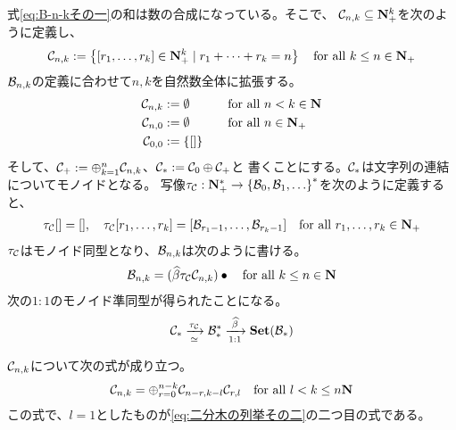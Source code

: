 {	式\eqref{eq:B-n-kその一}の和は数の合成になっている。そこで、
	${\mathcal{C}}_{n,k}\subseteq\mathbf{N}_+^k$を次のように定義し、
	\begin{equation*}\begin{split}
		{\mathcal{C}}_{n,k} := \mathinner{\left\{{{\mathinner{\left[{r_1,\dots,r_k}\right]}}\in\ensuremath{\mathbf{N}}_+^k\mid
			r_1+\cdots+r_k=n}\right\}} \quad\text{for all } k\le n\in\mathbf{N}_+
	\end{split}\end{equation*}
	${\mathcal{B}}_{n,k}$の定義に合わせて$n,k$を自然数全体に拡張する。
	\begin{alignat*}{2}
		{\mathcal{C}}_{n,k} &:= \emptyset &&\quad\text{for all } n<k\in\mathbf{N} \\
		{\mathcal{C}}_{n,0} &:= \emptyset &&\quad\text{for all } n\in\mathbf{N}_+ \\
		{\mathcal{C}}_{0,0} &:= \mathinner{\left\{{{\mathinner{\left[{}\right]}}}\right\}}
	\end{alignat*}
	そして、${\mathcal{C}}_+:=\oplus_{k=1}^n{\mathcal{C}}_{n,k}$、${\mathcal{C}}_*:={\mathcal{C}}_0\oplus{\mathcal{C}}_+$と
	書くことにする。${\mathcal{C}}_*$は文字列の連結についてモノイドとなる。
	写像$\tau_{\mathcal{C}}:\mathbf{N}_+^*\to\mathinner{\{{{\mathcal{B}}_0,{\mathcal{B}}_1,\dots}\}}^*$を次のように定義すると、
	\begin{equation*}\begin{split}
		\tau_{\mathcal{C}}{\mathinner{\left[{}\right]}} = {\mathinner{\left[{}\right]}},\quad
		\tau_{\mathcal{C}}{\mathinner{\left[{r_1,\dots,r_k}\right]}} = {\mathinner{\left[{{\mathcal{B}}_{r_1-1},\dots,{\mathcal{B}}_{r_k-1}}\right]}}
		\quad\text{for all } r_1,\dots,r_k\in\mathbf{N}_+
	\end{split}\end{equation*}
	$\tau_{\mathcal{C}}$はモノイド同型となり、${\mathcal{B}}_{n,k}$は次のように書ける。
	\begin{equation*}\begin{split}
		{\mathcal{B}}_{n,k} = \mathinner{({{{\widehat{\beta}}}\tau_{\mathcal{C}}{\mathcal{C}}_{n,k}})}\bullet
		\quad\text{for all } k\le n\in\mathbf{N}
	\end{split}\end{equation*}
	次の$1:1$のモノイド準同型が得られたことになる。
	\begin{equation*}\begin{split}
		{\mathcal{C}}_* \xrightarrow[{\simeq}]{\tau_{\mathcal{C}}} {\mathcal{B}}_*^* \xrightarrow[{1:1}]{{{\widehat{\beta}}}} {\mathbf{Set}}({\mathcal{B}}_*)
	\end{split}\end{equation*}

	${\mathcal{C}}_{n,k}$について次の式が成り立つ。
	\begin{equation*}\begin{split}
		{\mathcal{C}}_{n,k} = \oplus_{r=0}^{n-k}{\mathcal{C}}_{n-r,k-l}{\mathcal{C}}_{r,l}
		\quad\text{for all } l< k\le n\mathbf{N}
	\end{split}\end{equation*}
	この式で、$l=1$としたものが\eqref{eq:二分木の列挙その二}の二つ目の式である。

}
